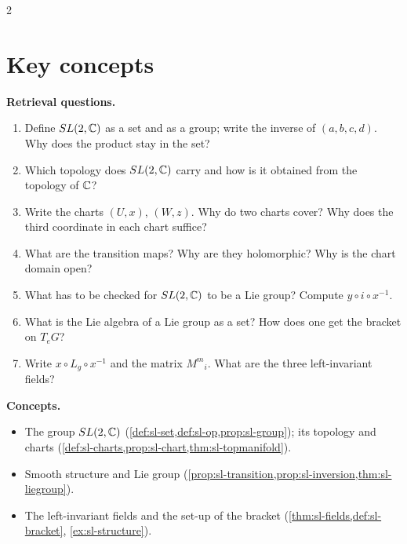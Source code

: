 \begin{paracol}{2}
\section*{Key concepts}
\begin{keyconcepts}
\textbf{Retrieval questions.}
\begin{enumerate}
  \item Define $SL(2,\mathbb{C})$ as a set and as a group; write the inverse of $(a,b,c,d)$. Why does the product stay in the set?
  \item Which topology does $SL(2,\mathbb{C})$ carry and how is it obtained from the topology of $\mathbb{C}$?
  \item Write the charts $(U,x)$, $(W,z)$. Why do two charts cover? Why does the third coordinate in each chart suffice?
  \item What are the transition maps? Why are they holomorphic? Why is the chart domain open?
  \item What has to be checked for $SL(2,\mathbb{C})$ to be a Lie group? Compute $y\circ i\circ x^{-1}$.
  \item What is the Lie algebra of a Lie group as a set? How does one get the bracket on $T_eG$?
  \item Write $x\circ L_g\circ x^{-1}$ and the matrix $M^m{}_i$. What are the three left-invariant fields?
\end{enumerate}
\textbf{Concepts.}
\begin{itemize}
  \item The group $SL(2,\mathbb{C})$ (\cref{def:sl-set,def:sl-op,prop:sl-group}); its topology and charts (\cref{def:sl-charts,prop:sl-chart,thm:sl-topmanifold}).
  \item Smooth structure and Lie group (\cref{prop:sl-transition,prop:sl-inversion,thm:sl-liegroup}).
  \item The left-invariant fields and the set-up of the bracket (\cref{thm:sl-fields,def:sl-bracket}, \cref{ex:sl-structure}).
\end{itemize}
\end{keyconcepts}

\flushside
\end{paracol}
